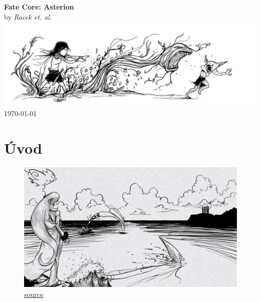 \documentclass[12pt,a4paper,twoside,openany]{book}
\newcommand{\booktitle}{Fate Core: Asterion}
\newcommand{\authorname}{Racek et. al. }
\begin{document}
\begin{titlepage}
    \centering
    {\Huge\textbf{\booktitle}}\\[1.5cm]
    {\Large by \textit{\authorname}}\\[2cm]
    \includegraphics[width=\textwidth]{logo}\\[2cm]
    \vfill
    {\large \today}
\end{titlepage}

\frontmatter  %

\tableofcontents

\mainmatter   %
\setlength{\columnsep}{1cm}  %

\chapter{Úvod}
\label{chap:introduction}


\begin{figure}[h!]
  \centering
  \caption{\href{https://davidramos.ca/wp-content/uploads/2021/04/cyn-1024x576.png}{source}}
  \includegraphics[width=\textwidth]{jezero}
\end{figure}
\end{document}
